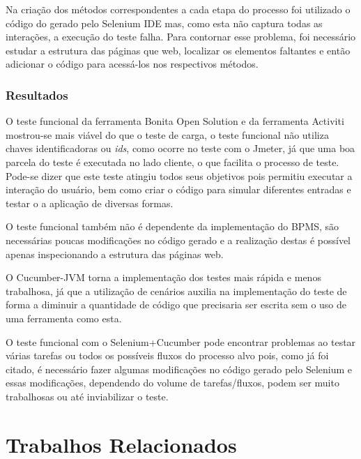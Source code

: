 \documentclass[12pt]{article}
\begin{document}
Na criação dos métodos correspondentes a cada etapa do processo foi utilizado o código do gerado pelo Selenium IDE mas, como esta não captura todas as interações, a execução do teste falha. Para contornar esse problema, foi necessário estudar a estrutura das páginas que web, localizar os elementos faltantes e então adicionar o código para acessá-los nos respectivos métodos.

\subsubsection{Resultados}

O teste funcional da ferramenta Bonita Open Solution e da ferramenta Activiti mostrou-se mais viável do que o teste de carga, o teste funcional não utiliza chaves identificadoras ou \emph{ids}, como ocorre no teste com o Jmeter, já que uma boa parcela do teste é executada no lado cliente, o que facilita o processo de teste. Pode-se dizer que este teste atingiu todos seus objetivos pois permitiu executar a interação do usuário, bem como criar o código para simular diferentes entradas e testar o a aplicação de diversas formas.

O teste funcional também não é dependente da implementação do BPMS, são necessárias poucas modificações no código gerado e a realização destas é possível apenas inspecionando a estrutura das páginas web.

O Cucumber-JVM torna a implementação dos testes mais rápida e menos trabalhosa, já que a utilização de cenários auxilia na implementação do teste de forma a diminuir a quantidade de código que precisaria ser escrita sem o uso de uma ferramenta como esta.

O teste funcional com o Selenium+Cucumber pode encontrar problemas ao testar várias tarefas ou todos os possíveis fluxos do processo alvo pois, como já foi citado, é necessário fazer algumas modificações no código gerado pelo Selenium e essas modificações, dependendo do volume de tarefas/fluxos, podem ser muito trabalhosas ou até inviabilizar o teste.

\section{Trabalhos Relacionados}

\end{document}
